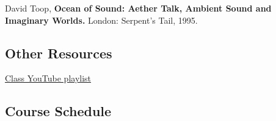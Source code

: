\documentclass[
  letterpaper,
  DIV=11,
  numbers=noendperiod]{scrartcl}
\begin{document}
David Toop, \textbf{Ocean of Sound: Aether Talk, Ambient Sound and
Imaginary Worlds.} London: Serpent's Tail, 1995.

\subsection{Other Resources}\label{other-resources}

\href{https://www.google.com/url?q=http://www.youtube.com/watch?v\%3DfYp6NhwIkjU&sa=D&ust=1600611913237000&usg=AOvVaw33MX-ZmRoea0Dq8zmhmaCX}{Class
YouTube playlist}

\subsection{Course Schedule}\label{course-schedule}
\end{document}
